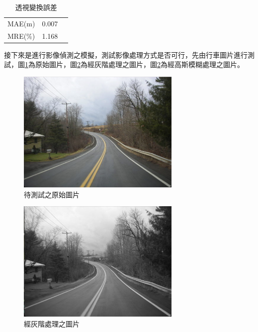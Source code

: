 \documentclass[12pt]{article}       %
\begin{document}
\begin{table}[H]
    \centering
    \caption{透視變換誤差}
    \vspace{6pt} %
    \label{tab:error_comparison}
    \begin{tabular}{lS[table-format=2.2]S[table-format=2.2]}
        \toprule
        MAE(m) & 0.007  \\
        MRE(\%) & 1.168 \\
        \bottomrule
    \end{tabular}
\end{table}

接下來是進行影像偵測之模擬，測試影像處理方式是否可行，先由行車圖片進行測試，圖\ref{fig:37}為原始圖片，圖\ref{fig:38}為經灰階處理之圖片，圖\ref{fig:38}為經高斯模糊處理之圖片。
\begin{figure}[H]
    \centering
    \includegraphics[width=0.7\textwidth]{37.jpg}     %
    \caption{待測試之原始圖片}    %
    \label{fig:37}    %
\end{figure}

\begin{figure}[H]
    \centering
    \includegraphics[width=0.7\textwidth]{38.jpg}     %
    \caption{經灰階處理之圖片}    %
    \label{fig:38}    %
\end{figure}
\end{document}
